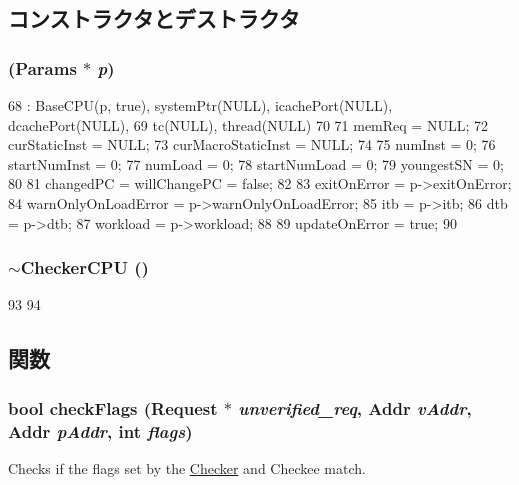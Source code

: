 \subsection{コンストラクタとデストラクタ}
\hypertarget{classCheckerCPU_a35dbdd3a266a1df157875f0f7c5b5f66}{
\subsubsection[{CheckerCPU}]{ ({\bf Params} $\ast$ {\em p})}}
\label{classCheckerCPU_a35dbdd3a266a1df157875f0f7c5b5f66}



\begin{DoxyCode}
68     : BaseCPU(p, true), systemPtr(NULL), icachePort(NULL), dcachePort(NULL),
69       tc(NULL), thread(NULL)
70 {
71     memReq = NULL;
72     curStaticInst = NULL;
73     curMacroStaticInst = NULL;
74 
75     numInst = 0;
76     startNumInst = 0;
77     numLoad = 0;
78     startNumLoad = 0;
79     youngestSN = 0;
80 
81     changedPC = willChangePC = false;
82 
83     exitOnError = p->exitOnError;
84     warnOnlyOnLoadError = p->warnOnlyOnLoadError;
85     itb = p->itb;
86     dtb = p->dtb;
87     workload = p->workload;
88 
89     updateOnError = true;
90 }
\end{DoxyCode}
\hypertarget{classCheckerCPU_ac259e064f2f0d74835ec2b38dd175ef4}{
\subsubsection[{$\sim$CheckerCPU}]{\setlength{\rightskip}{0pt plus 5cm}$\sim${\bf CheckerCPU} ()}}
\label{classCheckerCPU_ac259e064f2f0d74835ec2b38dd175ef4}



\begin{DoxyCode}
93 {
94 }
\end{DoxyCode}


\subsection{関数}
\hypertarget{classCheckerCPU_ab6e89553924f128af246935e240b11a4}{
\subsubsection[{checkFlags}]{\setlength{\rightskip}{0pt plus 5cm}bool checkFlags ({\bf Request} $\ast$ {\em unverified\_\-req}, \/  {\bf Addr} {\em vAddr}, \/  {\bf Addr} {\em pAddr}, \/  int {\em flags})}}
\label{classCheckerCPU_ab6e89553924f128af246935e240b11a4}
Checks if the flags set by the \hyperlink{classChecker}{Checker} and Checkee match. 


